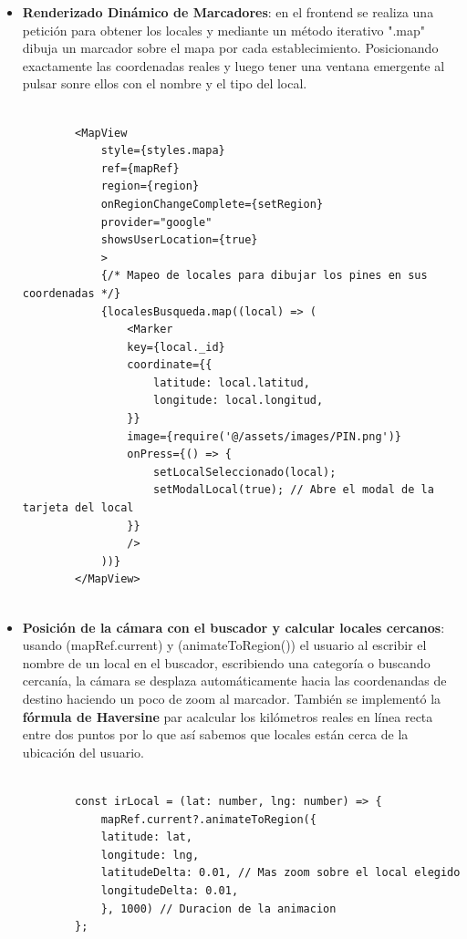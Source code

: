 \documentclass[a4paper,11pt]{article}
\begin{document}
\begin{itemize}
\begin{lstlisting}[style=javascript, caption={Permisos y ubicación del usuario.}]
    \end{lstlisting}
    \item \textbf{Renderizado Dinámico de Marcadores}: en el frontend se realiza una petición para obtener los locales y mediante un método iterativo ".map" dibuja un marcador sobre el mapa por cada establecimiento. Posicionando exactamente las coordenadas reales y luego tener una ventana emergente al pulsar sonre ellos con el nombre y el tipo del local.
     \vspace{0.2cm}
    \begin{lstlisting}[style=javascript, caption={Permisos y ubicación del usuario.}]

        <MapView 
            style={styles.mapa}
            ref={mapRef}
            region={region}
            onRegionChangeComplete={setRegion} 
            provider="google"
            showsUserLocation={true}
            >
            {/* Mapeo de locales para dibujar los pines en sus coordenadas */}
            {localesBusqueda.map((local) => (
                <Marker
                key={local._id}
                coordinate={{
                    latitude: local.latitud,
                    longitude: local.longitud,
                }}
                image={require('@/assets/images/PIN.png')}
                onPress={() => {
                    setLocalSeleccionado(local);
                    setModalLocal(true); // Abre el modal de la tarjeta del local
                }}
                />
            ))}
        </MapView>
        
    \end{lstlisting}
    \item \textbf{Posición de la cámara con el buscador y calcular locales cercanos}: usando (mapRef.current) y (animateToRegion()) el usuario al escribir el nombre de un local en el buscador, escribiendo una categoría o buscando cercanía, la cámara se desplaza automáticamente hacia las coordenandas de destino haciendo un poco de zoom al marcador. También se implementó la \textbf{fórmula de Haversine} par acalcular los kilómetros reales en línea recta entre dos puntos por lo que así sabemos que locales están cerca de la ubicación del usuario.
    \vspace{0.2cm}
    \begin{lstlisting}[style=javascript, caption={Localización y búsqueda locales cercanos.}]

        const irLocal = (lat: number, lng: number) => {
            mapRef.current?.animateToRegion({
            latitude: lat,
            longitude: lng,
            latitudeDelta: 0.01, // Mas zoom sobre el local elegido
            longitudeDelta: 0.01,
            }, 1000) // Duracion de la animacion
        };


\end{lstlisting}
\end{itemize}
\end{document}
